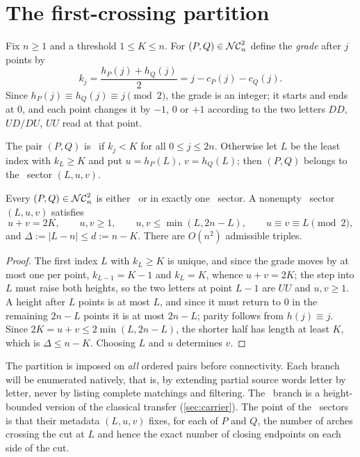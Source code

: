 \section{The first-crossing partition}
\label{sec:partition}

Fix $n\ge1$ and a threshold $1\le K\le n$. For $(P,Q)\in\mathcal{NC}_n^2$ define the
\emph{grade} after $j$ points by
\[
 k_j=\frac{h_P(j)+h_Q(j)}{2}=j-c_P(j)-c_Q(j).
\]
Since $h_P(j)\equiv h_Q(j)\equiv j\pmod2$, the grade is an integer; it starts and
ends at $0$, and each point changes it by $-1$, $0$ or $+1$ according to the two
letters $DD$, $UD/DU$, $UU$ read at that point.

\begin{definition}
\label{def:sectors}
\leanok
The pair $(P,Q)$ is \LOW\ if $k_j<K$ for all $0\le j\le 2n$. Otherwise let
$L$ be the least index with $k_L\ge K$ and put $u=h_P(L)$, $v=h_Q(L)$; then
$(P,Q)$ belongs to the \HIGH\ sector $(L,u,v)$.
\end{definition}

\begin{lemma}
\label{lem:partition}
\leanok
{}
Every $(P,Q)\in\mathcal{NC}_n^2$ is either \LOW\ or in exactly one \HIGH\ sector. A
nonempty \HIGH\ sector $(L,u,v)$ satisfies
\[
 u+v=2K,\qquad u,v\ge1,\qquad u,v\le\min(L,2n-L),\qquad u\equiv v\equiv L\pmod2,
\]
and $\Delta:=|L-n|\le d:=n-K$. There are $O(n^{2})$ admissible triples.
\end{lemma}

\begin{proof}
\leanok
The first index $L$ with $k_L\ge K$ is unique, and since the grade moves by at
most one per point, $k_{L-1}=K-1$ and $k_L=K$, whence $u+v=2K$; the step into
$L$ must raise both heights, so the two letters at point $L-1$ are $UU$ and
$u,v\ge1$. A height after $L$ points is at most $L$, and since it must return
to $0$ in the remaining $2n-L$ points it is at most $2n-L$; parity follows from
$h(j)\equiv j$. Since $2K=u+v\le2\min(L,2n-L)$, the shorter half has length at least $K$,
which is $\Delta\le n-K$. Choosing $L$ and $u$ determines $v$.
\end{proof}

The partition is imposed on \emph{all} ordered pairs before connectivity. Each
branch will be enumerated natively, that is, by extending partial source words
letter by letter, never by listing complete matchings and filtering. The
\LOW\ branch is a height-bounded version of the classical transfer
(\cref{sec:carrier}). The point of the \HIGH\ sectors is that their metadata
$(L,u,v)$ fixes, for each of $P$ and $Q$, the number of arches crossing the cut
at $L$ and hence the exact number of closing endpoints on each side of the cut.

